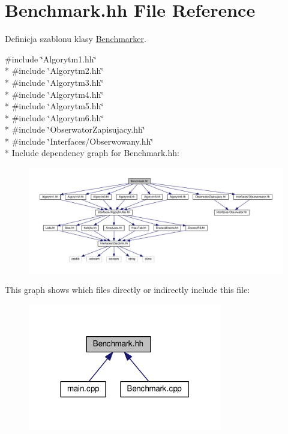 \hypertarget{a00036}{}\section{Benchmark.\+hh File Reference}
\label{a00036}


Definicja szablonu klasy \hyperlink{a00009}{Benchmarker}.  


{\ttfamily \#include \char`\"{}Algorytm1.\+hh\char`\"{}}\\*
{\ttfamily \#include \char`\"{}Algorytm2.\+hh\char`\"{}}\\*
{\ttfamily \#include \char`\"{}Algorytm3.\+hh\char`\"{}}\\*
{\ttfamily \#include \char`\"{}Algorytm4.\+hh\char`\"{}}\\*
{\ttfamily \#include \char`\"{}Algorytm5.\+hh\char`\"{}}\\*
{\ttfamily \#include \char`\"{}Algorytm6.\+hh\char`\"{}}\\*
{\ttfamily \#include \char`\"{}Obserwator\+Zapisujacy.\+hh\char`\"{}}\\*
{\ttfamily \#include \char`\"{}Interfaces/\+Obserwowany.\+hh\char`\"{}}\\*
Include dependency graph for Benchmark.\+hh\+:
\nopagebreak
\begin{figure}[H]
\begin{center}
\leavevmode
\includegraphics[width=350pt]{a00084}
\end{center}
\end{figure}
This graph shows which files directly or indirectly include this file\+:
\nopagebreak
\begin{figure}[H]
\begin{center}
\leavevmode
\includegraphics[width=239pt]{a00085}
\end{center}
\end{figure}
